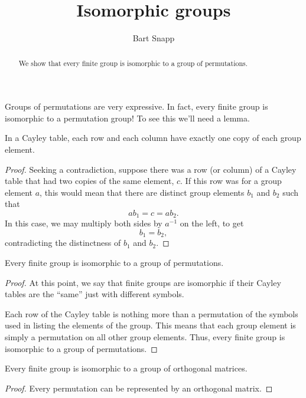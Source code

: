 \documentclass{ximera}
\author{Bart Snapp}
\title{Isomorphic groups}
\begin{document}
\begin{abstract}
  We show that every finite group is isomorphic to a group of
  permutations.
\end{abstract}
\maketitle

Groups of permutations are very expressive. In fact, every finite group
is isomorphic to a permutation group! To see this we'll need a lemma.

\begin{lemma}\label{L:oepr}
  In a Cayley table, each row and each column have exactly one copy of
  each group element.
  \begin{proof}
    Seeking a contradiction, suppose there was a row (or column) of a
    Cayley table that had two copies of the same element, $c$. If this
    row was for a group element $a$, this would mean that there are
    distinct group elements $b_1$ and $b_2$ such that
    \[
    ab_1 =c = ab_2.
    \]
    In this case, we may multiply both sides by $a^{-1}$ on the left,
    to get
    \[
    b_1 = b_2,
    \]
    contradicting the distinctness of $b_1$ and $b_2$.
  \end{proof}
\end{lemma}


\begin{theorem}
  Every finite group is isomorphic to a group of permutations.
  \begin{proof}
    At this point, we say that finite groups are isomorphic if their
    Cayley tables are the ``same'' just with different symbols.


    Each row of the Cayley table is nothing more than a permutation of
    the symbols used in listing the elements of the group. This means
    that each group element is simply a permutation on all other group
    elements. Thus, every finite group is isomorphic to a group of
    permutations.
  \end{proof}
\end{theorem}

\begin{corollary}
  Every finite group is isomorphic to a group of orthogonal matrices.
  \begin{proof}
    Every permutation can be represented by an orthogonal matrix.
  \end{proof}
\end{corollary}
\end{document}
